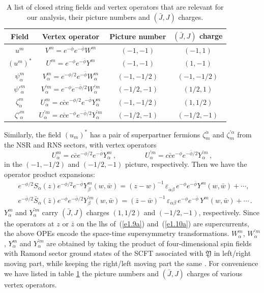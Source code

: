 \documentclass[12pt,a4paper]{article}
\newcommand{\be}{\begin{equation}}
\newcommand{\ee}{\end{equation}}
\newcommand{\refb}[1]{(\ref{#1})}
\newcommand{\ve}{\varepsilon}
\newcommand{\dalpha}{\beta}
\def\CY{\mathfrak{Y}}
\def\dalpha{{\dot\alpha}}
\def\dbeta{{\dot\beta}}
\def\cpi{u}
\def\cfi{\zeta}
\begin{document}
\begin{table}
\centering
{\setlength\extrarowheight{2pt}

   \begin{tabular}{|c|c|c|c|}
\hline
  Field & Vertex operator & Picture number & $(\bar J,J)$ charge  \\
    \hline
   $\cpi^m$ & $V^m=e^{-\phi}e^{-\bar\phi}W^m$ & $(-1,-1)$ & $(-1,1)$ \\
   \hline
 $(\cpi^{m})^\ast $ & $U^m=e^{-\phi}e^{-\bar\phi}Y^m$ & $(-1,-1)$ & $(1,-1)$ \\
   \hline
   $\psi^m_\alpha $&$V^m_\alpha=e^{-\phi/2}e^{-\bar\phi}W^{m}_\alpha$ & $(-1,-1/2)$ & $(-1,-1/2)$ \\
   \hline
   $\psi'^m_\dalpha $& $V^{\prime m}_{\dalpha}=
   e^{-\phi}e^{-\bar\phi/2}W^{\prime m}_{\dalpha}$ & $(-1/2,-1)$ & $(1/2,1)$ \\
   \hline
  $\cfi^m_\dalpha$&$U_\dalpha^{m}=c\bar c e^{-\phi/2} e^{-\bar\phi}Y^{m}_\dalpha$ & $(-1,-1/2)$ & $(1,1/2)$ \\
   \hline
   $\cfi'^m_\alpha$& $U^{\prime m}_{\alpha}=c\bar c e^{-\phi} e^{-\bar\phi/2}
Y^{\prime m}_\alpha$ & $(-1/2,-1)$ & $(-1/2,-1)$ \\
    \hline   \end{tabular}}
    \caption{ A list of closed string fields and vertex operators that are relevant for our analysis,
    their picture numbers and $(\bar J,J)$ charges.}
    \label{t1}
\end{table}


Similarly, the field $(\cpi_m)^*$ has a pair of superpartner fermions
$\cfi_m^\dalpha$ and $\cfi^{\prime \alpha}_m$
from the NSR and RNS sectors, with vertex operators
\be\label{efermustarvert}
U_\dalpha^{m}=c\bar c e^{-\phi/2} e^{-\bar\phi}Y^{m}_\dalpha
\,,\qquad\qquad
U^{\prime m}_{\alpha}=c\bar c e^{-\phi} e^{-\bar\phi/2}
Y^{\prime m}_\alpha\,,
\ee
in the $(-1,-1/2)$ and $(-1/2,-1)$ picture, respectively. Then we have
the operator product expansions:
\be\label{e1.10a}
\begin{split}
& e^{-\phi/2}S_\dalpha (z) e^{-\phi/2}e^{-\bar\phi}Y^{m}_\dbeta(w,\bar w) = (z-w)^{-1} \, \ve_{\dalpha\dbeta} \,
e^{-\phi}e^{-\bar\phi} Y^{m}(w,\bar w)+\cdots ,
\\
& e^{-\bar\phi/2}\bar S_\alpha (\bar z) e^{-\phi}e^{-\bar\phi/2}Y^{\prime m}_{\beta}(w,\bar w)
= (\bar z-\bar
w)^{-1} \, \ve_{\alpha\beta} \, e^{-\phi}e^{-\bar\phi}\, Y^{m}(w,\bar w)+\cdots \, .
\end{split}
\ee
$Y_\dalpha^{m}$ and $Y^{\prime m}_{\alpha}$ carry $(\bar J,J)$ charges
$(1,1/2)$ and $(-1/2,-1)$,
respectively. Since the operators at $z$ or $\bar z$ on the lhs of~\refb{e1.9a}
and~\refb{e1.10a} are supercurrents, the above OPEs encode the space-time
supersymmetry transformations.
$W_\alpha^{m}$, $W^{\prime m}_{\dalpha}$, $Y^{m}_\dalpha$ and $Y^{\prime m}_\alpha$ are
obtained by taking the product of four-dimensional spin fields with
Ramond sector ground states of the SCFT associated with $\CY$ in left/right moving part,
while keeping the right/left moving part the same \cite{Lerche:1989uy}.
For convenience we have listed in table \ref{t1} the picture numbers and $(\bar J,J)$ charges
of various vertex operators.
\end{document}

